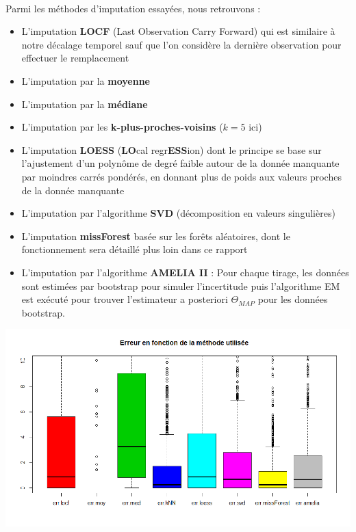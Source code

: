\documentclass[14pt, openany]{article}
\begin{document}
\paragraph{}
Parmi les méthodes d'imputation essayées, nous retrouvons :
\begin{itemize}
\item L'imputation \textbf{LOCF} (Last Observation Carry Forward) qui est similaire à notre décalage temporel sauf que l'on considère la dernière observation pour effectuer le remplacement
\item L'imputation par la \textbf{moyenne}
\item L'imputation par la \textbf{médiane}
\item L'imputation par les \textbf{k-plus-proches-voisins} ($k=5$ ici)
\item L'imputation \textbf{LOESS} (\textbf{LO}cal regr\textbf{ESS}ion) dont le principe se base sur l'ajustement d'un polynôme de degré faible autour de la donnée manquante par moindres carrés pondérés, en donnant plus de poids aux valeurs proches de la donnée manquante
\item L'imputation par l'algorithme \textbf{SVD} (décomposition en valeurs singulières)
\item L'imputation \textbf{missForest} basée sur les forêts aléatoires, dont le fonctionnement sera détaillé plus loin dans ce rapport
\item L'imputation par l'algorithme \textbf{AMELIA II} : Pour chaque tirage, les données sont estimées par bootstrap pour simuler l'incertitude puis l'algorithme EM est exécuté pour trouver l'estimateur a posteriori $\Theta_{MAP}$ pour les données bootstrap.
\end{itemize}

\includegraphics[width=17cm]{Images/err_imp.png}
\begin{center}
\label{fig1}
\end{center}
\end{document}

